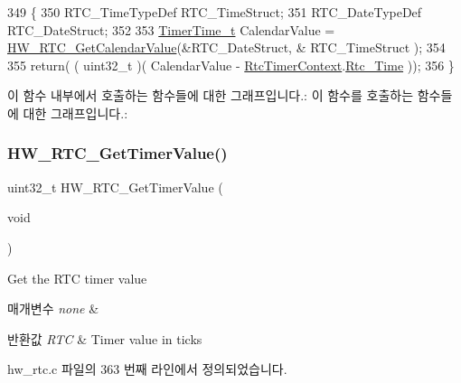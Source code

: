 \begin{DoxyCode}
349 \{
350   RTC\_TimeTypeDef RTC\_TimeStruct;
351   RTC\_DateTypeDef RTC\_DateStruct;
352   
353   \mbox{\hyperlink{utilities_8h_a4215ca43d3e953099ea758ce428599d0}{TimerTime\_t}} CalendarValue = \mbox{\hyperlink{group___lory_s_d_k___r_t_c___functions_gaf81b8dc866a5c7b125355b55e3953387}{HW\_RTC\_GetCalendarValue}}(&RTC\_DateStruct, &
      RTC\_TimeStruct );
354 
355   \textcolor{keywordflow}{return}( ( uint32\_t )( CalendarValue - \mbox{\hyperlink{hw__rtc_8c_a0e042f0e024135713eeb5896d77a2356}{RtcTimerContext}}.\mbox{\hyperlink{struct_rtc_timer_context__t_a05f48439ba05c77e6271805cff79760f}{Rtc\_Time}} ));
356 \}
\end{DoxyCode}
이 함수 내부에서 호출하는 함수들에 대한 그래프입니다.\+:
이 함수를 호출하는 함수들에 대한 그래프입니다.\+:
\mbox{\label{group___lory_s_d_k___r_t_c___functions_gad0d80bf1ac3a9704f4b4b9d672f38daa}} 
\subsubsection{\texorpdfstring{H\+W\+\_\+\+R\+T\+C\+\_\+\+Get\+Timer\+Value()}{HW\_RTC\_GetTimerValue()}}
{\footnotesize\ttfamily uint32\+\_\+t H\+W\+\_\+\+R\+T\+C\+\_\+\+Get\+Timer\+Value (\begin{DoxyParamCaption}\item[{void}]{ }\end{DoxyParamCaption})}



Get the R\+TC timer value 


\begin{DoxyParams}{매개변수}
{\em none} & \\
\hline
\end{DoxyParams}

\begin{DoxyRetVals}{반환값}
{\em R\+TC} & Timer value in ticks \\
\hline
\end{DoxyRetVals}


hw\+\_\+rtc.\+c 파일의 363 번째 라인에서 정의되었습니다.


